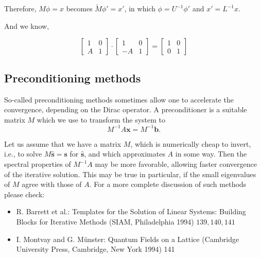 \documentclass[11pt]{article} %
\begin{document}
Therefore, $M \phi = x$ becomes $\tilde{M} \phi' = x'$, in which $\phi = U^{-1} \phi'$ and $x' = L^{-1} x$.

And we know,

\begin{equation}
    \left[\begin{array}{cc}
    1 & 0 \\
    A & 1
    \end{array}\right] \cdot\left[\begin{array}{cc}
    1 & 0 \\
    -A & 1
    \end{array}\right] = \left[\begin{array}{cc}
    1 & 0 \\
    0 & 1
    \end{array}\right]
\end{equation}

\subsection{Preconditioning methods}

\noindent

So-called preconditioning methods sometimes allow one to accelerate the convergence, depending on the Dirac operator. A preconditioner is a suitable matrix $M$ which we use to transform the system to
\[    M^{-1} A \boldsymbol{x}=M^{-1} \boldsymbol{b}. \]

Let us assume that we have a matrix $M$, which is numerically cheap to invert, i.e., to solve $M \hat{\boldsymbol{s}}=\boldsymbol{s}$ for $\hat{\boldsymbol{s}}$, and which approximates $A$ in some way. Then the spectral properties of $M^{-1} A$ may be more favorable, allowing faster convergence of the iterative solution. This may be true in particular, if the small eigenvalues of $M$ agree with those of $A$. For a more complete discussion of such methods please check:

\begin{itemize}
    \item R. Barrett et al.: Templates for the Solution of Linear Systems: Building Blocks for Iterative Methods (SIAM, Philadelphia 1994) $139,140,141$
    \item I. Montvay and G. Münster: Quantum Fields on a Lattice (Cambridge University Press, Cambridge, New York 1994) 141
\end{itemize}
\end{document}

